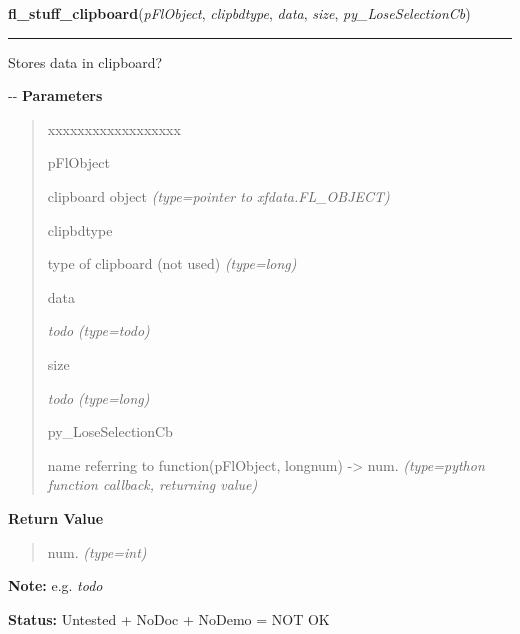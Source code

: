 \hspace{.8\funcindent}\begin{boxedminipage}{\funcwidth}

    \raggedright \textbf{fl\_stuff\_clipboard}(\textit{pFlObject}, \textit{clipbdtype}, \textit{data}, \textit{size}, \textit{py\_LoseSelectionCb})

    \vspace{-1.5ex}

    \rule{\textwidth}{0.5\fboxrule}
\setlength{\parskip}{2ex}

Stores data in clipboard?

-{}-
\setlength{\parskip}{1ex}
      \textbf{Parameters}
      \vspace{-1ex}

      \begin{quote}
        \begin{Ventry}{xxxxxxxxxxxxxxxxxx}

          \item[pFlObject]


clipboard object
            {\it (type=pointer to xfdata.FL\_OBJECT)}

          \item[clipbdtype]


type of clipboard (not used)
            {\it (type=long)}

          \item[data]


\emph{todo}
            {\it (type=\emph{todo})}

          \item[size]


\emph{todo}
            {\it (type=long)}

          \item[py\_LoseSelectionCb]


name referring to function(pFlObject, longnum) -> num.
            {\it (type=python function callback, returning value)}

        \end{Ventry}

      \end{quote}

      \textbf{Return Value}
    \vspace{-1ex}

      \begin{quote}

num.
      {\it (type=int)}

      \end{quote}

\textbf{Note:} 
e.g. \emph{todo}


\textbf{Status:} 
Untested + NoDoc + NoDemo = NOT OK


    \end{boxedminipage}

